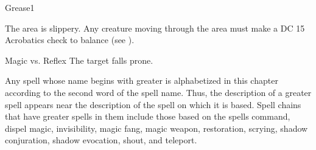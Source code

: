 \begin{spellsection}{Grease}{1}
\begin{spellheader}
\end{spellheader}
\begin{spellcontent}
    \begin{spelltargetinginfo}
    \end{spelltargetinginfo}
    \begin{spelleffects}
        \spelleffect The area is slippery. Any creature moving through the area must make a DC 15 Acrobatics check to balance (see ).
        \spelldur \durshort
    \end{spelleffects}
\end{spellcontent}
\begin{spellsubcontent}
    \begin{spelltargetinginfo}
    \end{spelltargetinginfo}
    \begin{spelleffects}
        \begin{spellattack}{Magic vs. Reflex}
            \spellsuccess The target falls prone.
        \end{spellattack}
    \end{spelleffects}
\end{spellsubcontent}
\begin{spellfooter}
    \spellnotes \physicalspellnotes
\end{spellfooter}

\par Any spell whose name begins with greater is alphabetized in this chapter according to the second word of the spell name. Thus, the description of a greater spell appears near the description of the spell on which it is based. Spell chains that have greater spells in them include those based on the spells command, dispel magic, invisibility, magic fang, magic weapon, restoration, scrying, shadow conjuration, shadow evocation, shout, and teleport.
\end{spellsection}

